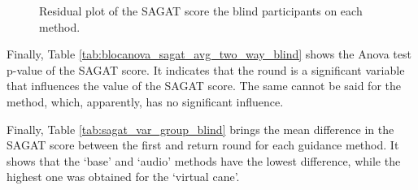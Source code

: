\begin{figure}[!htb]
\begin{minipage}{0.45\textwidth}
        \caption{Residual plot of the SAGAT score the blind participants on each method.}
        \label{fig:residplot_sagat_avg_two_way_blind}
    \end{minipage}
\end{figure}

Finally, Table \ref{tab:blocanova_sagat_avg_two_way_blind} shows the Anova test p-value of the SAGAT score. It indicates that the round is a significant variable that influences the value of the SAGAT score. The same cannot be said for the method, which, apparently, has no significant influence.



Finally, Table \ref{tab:sagat_var_group_blind} brings the mean difference in the SAGAT score between the first and return round for each guidance method. It shows that the ‘base’ and ‘audio’ methods have the lowest difference, while the highest one was obtained for the ‘virtual cane’.



\FloatBarrier